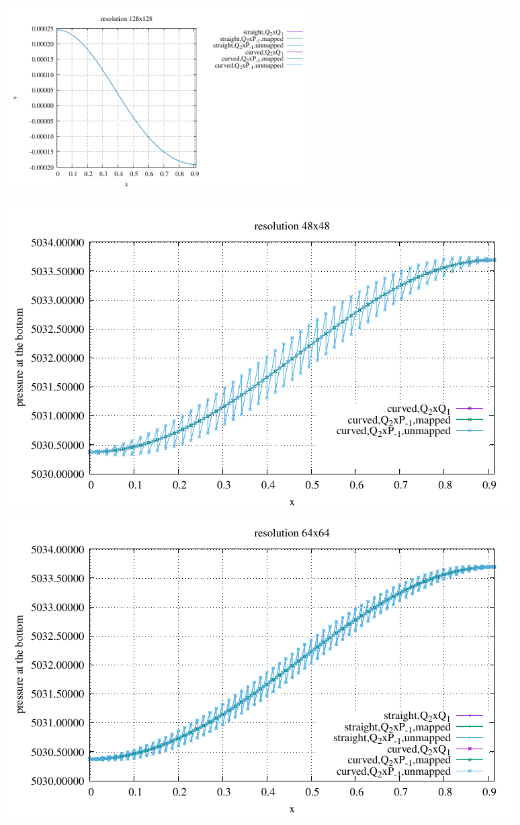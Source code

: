 \begin{center}
\includegraphics[width=8cm]{python_codes/fieldstone_25/results/isoviscous/interface_v_128.pdf}\\
\end{center}

\begin{center}
\includegraphics[width=14cm]{python_codes/fieldstone_25/results/isoviscous/pbottom48.pdf}\\
\includegraphics[width=14cm]{python_codes/fieldstone_25/results/isoviscous/pbottom64.pdf}\\

\end{center}
